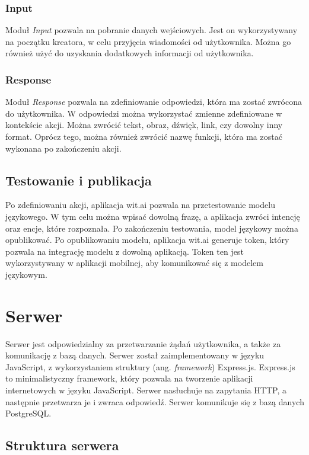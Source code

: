 \subsubsection{Input}
Moduł \textit{Input} pozwala na pobranie danych wejściowych. Jest on wykorzystywany na początku kreatora, w celu przyjęcia wiadomości od użytkownika. Można go również użyć do uzyskania dodatkowych informacji od użytkownika.

\subsubsection{Response}
Moduł \textit{Response} pozwala na zdefiniowanie odpowiedzi, która ma zostać zwrócona do użytkownika. W odpowiedzi można wykorzystać zmienne zdefiniowane w kontekście akcji. Można zwrócić tekst, obraz, dźwięk, link, czy dowolny inny format. Oprócz tego, można również zwrócić nazwę funkcji, która ma zostać wykonana po zakończeniu akcji.


\subsection{Testowanie i publikacja}
Po zdefiniowaniu akcji, aplikacja wit.ai pozwala na przetestowanie modelu językowego. W tym celu można wpisać dowolną frazę, a aplikacja zwróci intencję oraz encje, które rozpoznała. Po zakończeniu testowania, model językowy można opublikować. Po opublikowaniu modelu, aplikacja wit.ai generuje token, który pozwala na integrację modelu z dowolną aplikacją. Token ten jest wykorzystywany w aplikacji mobilnej, aby komunikować się z modelem językowym.


\section{Serwer}
Serwer jest odpowiedzialny za przetwarzanie żądań użytkownika, a także za komunikację z bazą danych. Serwer został zaimplementowany w języku JavaScript, z wykorzystaniem struktury (ang. \textit{framework}) Express.js. Express.js to minimalistyczny framework, który pozwala na tworzenie aplikacji internetowych w języku JavaScript. Serwer nasłuchuje na zapytania HTTP, a następnie przetwarza je i zwraca odpowiedź. Serwer komunikuje się z bazą danych PostgreSQL. 

\subsection{Struktura serwera}

